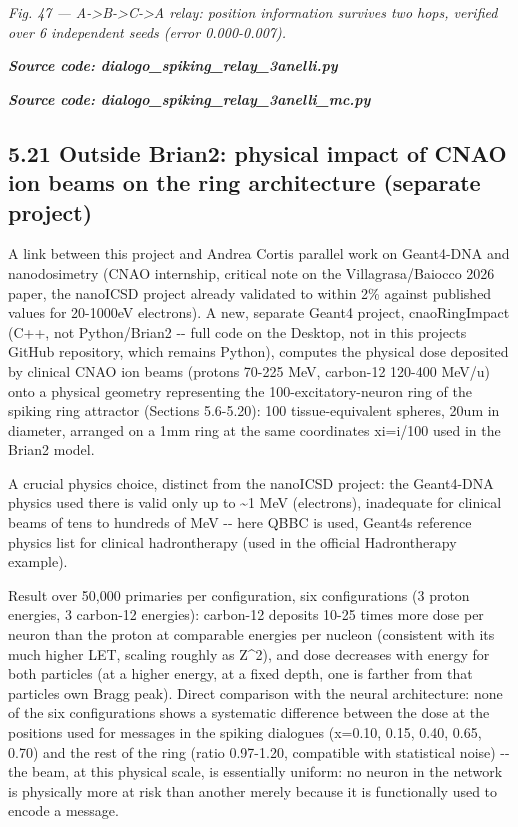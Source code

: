 \documentclass[
  english,
]{article}
\newcounter{none} %
\begin{document}
\emph{Fig. 47 --- A-\textgreater B-\textgreater C-\textgreater A relay: position information survives two hops, verified over 6 independent seeds (error 0.000-0.007).}

\textit{\textbf{Source code: dialogo\_\allowbreak{}spiking\_\allowbreak{}relay\_\allowbreak{}3anelli.py}}


\textit{\textbf{Source code: dialogo\_\allowbreak{}spiking\_\allowbreak{}relay\_\allowbreak{}3anelli\_\allowbreak{}mc.py}}


\subsection{5.21 Outside Brian2: physical impact of CNAO ion beams on the ring architecture (separate project)}\label{outside-brian2-physical-impact-of-cnao-ion-beams-on-the-ring-architecture-separate-project}

A link between this project and Andrea Corti\textquotesingle s parallel work on Geant4-DNA and nanodosimetry (CNAO internship, critical note on the Villagrasa/Baiocco 2026 paper, the nanoICSD project already validated to within 2\% against published values for 20-1000eV electrons). A new, separate Geant4 project, cnaoRingImpact (C++, not Python/Brian2 -\/- full code on the Desktop, not in this project\textquotesingle s GitHub repository, which remains Python), computes the physical dose deposited by clinical CNAO ion beams (protons 70-225 MeV, carbon-12 120-400 MeV/u) onto a physical geometry representing the 100-excitatory-neuron ring of the spiking ring attractor (Sections 5.6-5.20): 100 tissue-equivalent spheres, 20um in diameter, arranged on a 1mm ring at the same coordinates xi=i/100 used in the Brian2 model.

A crucial physics choice, distinct from the nanoICSD project: the Geant4-DNA physics used there is valid only up to \textasciitilde1 MeV (electrons), inadequate for clinical beams of tens to hundreds of MeV -\/- here QBBC is used, Geant4\textquotesingle s reference physics list for clinical hadrontherapy (used in the official Hadrontherapy example).

Result over 50,000 primaries per configuration, six configurations (3 proton energies, 3 carbon-12 energies): carbon-12 deposits 10-25 times more dose per neuron than the proton at comparable energies per nucleon (consistent with its much higher LET, scaling roughly as Z\^{}2), and dose decreases with energy for both particles (at a higher energy, at a fixed depth, one is farther from that particle\textquotesingle s own Bragg peak). Direct comparison with the neural architecture: none of the six configurations shows a systematic difference between the dose at the positions used for messages in the spiking dialogues (x=0.10, 0.15, 0.40, 0.65, 0.70) and the rest of the ring (ratio 0.97-1.20, compatible with statistical noise) -\/- the beam, at this physical scale, is essentially uniform: no neuron in the network is physically more at risk than another merely because it is functionally used to encode a message.
\end{document}
